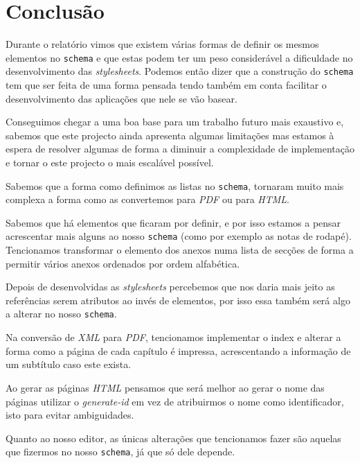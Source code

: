\documentclass[a4paper]{article}
\begin{document}


\newpage
\section{\LARGE Conclusão}
\hspace{1cm}Durante o relatório vimos que existem várias formas de definir os mesmos elementos no \verb|schema| e que estas podem ter um peso considerável a dificuldade no desenvolvimento das {\em stylesheets}. Podemos então dizer que a construção do \verb|schema| tem que ser feita de uma forma pensada tendo também em conta facilitar o desenvolvimento das aplicações que nele se vão basear.

\hspace{1cm}Conseguimos chegar a uma boa base para um trabalho futuro mais exaustivo e, sabemos que este projecto ainda apresenta algumas limitações mas estamos à espera de resolver algumas de forma a diminuir a complexidade de implementação e tornar o este projecto o mais escalável possível.

\hspace{1cm}Sabemos que a forma como definimos as listas no \verb|schema|, tornaram muito mais complexa a forma como as convertemos para {\em PDF} ou para {\em HTML}.

\hspace{1cm}Sabemos que há elementos que ficaram por definir, e por isso estamos a pensar acrescentar mais alguns ao nosso \verb|schema| (como por exemplo as notas de rodapé). Tencionamos transformar o elemento dos anexos numa lista de secções de forma a permitir vários anexos ordenados por ordem alfabética.

\hspace{1cm}Depois de desenvolvidas as {\em stylesheets} percebemos que nos daria mais jeito as referências serem atributos ao invés de elementos, por isso essa também será algo a alterar no nosso \verb|schema|.

\hspace{1cm}Na conversão de {\em XML} para {\em PDF}, tencionamos implementar o index e alterar a forma como a página de cada capítulo é impressa, acrescentando a informação de um subtítulo caso este exista.

\hspace{1cm}Ao gerar as páginas {\em HTML} pensamos que será melhor ao gerar o nome das páginas utilizar o {\em generate-id} em vez de atribuirmos o nome como identificador, isto para evitar ambiguidades.

\hspace{1cm}Quanto ao nosso editor, as únicas alterações que tencionamos fazer são aquelas que fizermos no nosso \verb|schema|, já que só dele depende.\\

\newpage
\printglossary
{}
\end{document}
